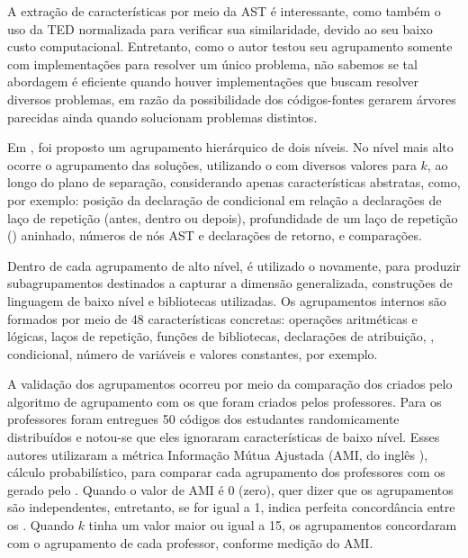 		A extração de características por meio da AST é interessante, como também
		o uso da TED normalizada para verificar sua similaridade, devido ao seu
		baixo custo computacional. Entretanto, como o autor testou seu agrupamento
		somente com implementações para resolver um único problema, não sabemos se
		tal abordagem é eficiente quando houver implementações que buscam resolver
		diversos problemas, em razão da possibilidade dos códigos-fontes gerarem
		árvores parecidas ainda quando solucionam problemas distintos.
		
		Em , foi proposto um agrupamento hierárquico de dois
		níveis. No nível mais alto ocorre o agrupamento das soluções, utilizando o
		 com diversos valores para $k$, ao longo do plano de separação,
		considerando apenas características abstratas, como, por exemplo: posição da
		declaração de condicional em relação a declarações de laço de repetição (antes,
		dentro ou depois), profundidade de um laço de repetição ()
		aninhado, números de nós AST e declarações de retorno,  e comparações.
		
		Dentro de cada agrupamento de alto nível, é utilizado o 
		novamente, para produzir subagrupamentos destinados a capturar a dimensão
		generalizada, construções de linguagem de baixo nível e bibliotecas utilizadas.
		Os agrupamentos internos são formados por meio de 48 características concretas:
		operações aritméticas e lógicas, laços de repetição, funções de bibliotecas,
		declarações de atribuição, , condicional, número de variáveis
		e valores constantes, por exemplo.
		
		A validação dos agrupamentos ocorreu por meio da comparação dos 
		criados pelo algoritmo de agrupamento com os que foram criados pelos professores.
		Para os professores foram entregues 50 códigos dos estudantes randomicamente
		distribuídos e notou-se que eles ignoraram características de baixo nível.
		Esses autores utilizaram a métrica Informação Mútua Ajustada (AMI, do inglês
		), cálculo probabilístico, para comparar
		cada agrupamento dos professores com os  gerado pelo .
		Quando o valor de AMI é 0 (zero), quer dizer que os agrupamentos são
		independentes, entretanto, se for igual a 1, indica perfeita concordância
		entre os . Quando $k$ tinha um valor maior ou igual a 15,
		os agrupamentos concordaram com o agrupamento de cada professor, conforme
		medição do AMI.
		
